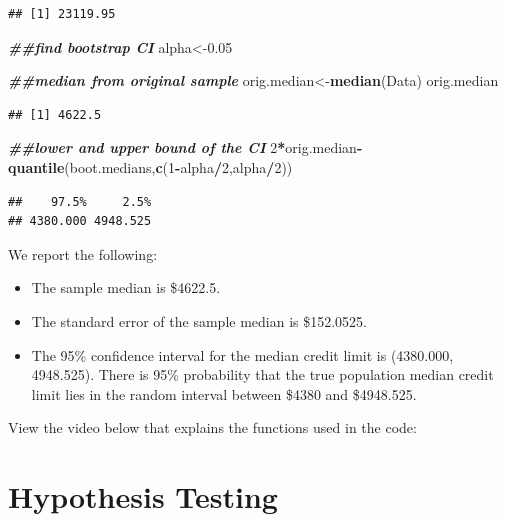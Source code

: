 \documentclass[
]{book}
\newenvironment{Shaded}{\begin{snugshade}}{\end{snugshade}}
\newcommand{\DecValTok}[1]{\textcolor[rgb]{0.00,0.00,0.81}{#1}}
\newcommand{\DocumentationTok}[1]{\textcolor[rgb]{0.56,0.35,0.01}{\textbf{\textit{#1}}}}
\newcommand{\FloatTok}[1]{\textcolor[rgb]{0.00,0.00,0.81}{#1}}
\newcommand{\FunctionTok}[1]{\textcolor[rgb]{0.13,0.29,0.53}{\textbf{#1}}}
\newcommand{\NormalTok}[1]{#1}
\newcommand{\OtherTok}[1]{\textcolor[rgb]{0.56,0.35,0.01}{#1}}
\newcommand{\SpecialCharTok}[1]{\textcolor[rgb]{0.81,0.36,0.00}{\textbf{#1}}}
\providecommand{\tightlist}{%
  \setlength{\itemsep}{0pt}\setlength{\parskip}{0pt}}
\begin{document}
\begin{verbatim}
## [1] 23119.95
\end{verbatim}

\begin{Shaded}
\begin{Highlighting}[]
\DocumentationTok{\#\#find bootstrap CI}
\NormalTok{alpha}\OtherTok{\textless{}{-}}\FloatTok{0.05}

\DocumentationTok{\#\#median from original sample}
\NormalTok{orig.median}\OtherTok{\textless{}{-}}\FunctionTok{median}\NormalTok{(Data)}
\NormalTok{orig.median}
\end{Highlighting}
\end{Shaded}

\begin{verbatim}
## [1] 4622.5
\end{verbatim}

\begin{Shaded}
\begin{Highlighting}[]
\DocumentationTok{\#\#lower and upper bound of the CI}
\DecValTok{2}\SpecialCharTok{*}\NormalTok{orig.median}\SpecialCharTok{{-}}\FunctionTok{quantile}\NormalTok{(boot.medians,}\FunctionTok{c}\NormalTok{(}\DecValTok{1}\SpecialCharTok{{-}}\NormalTok{alpha}\SpecialCharTok{/}\DecValTok{2}\NormalTok{,alpha}\SpecialCharTok{/}\DecValTok{2}\NormalTok{))}
\end{Highlighting}
\end{Shaded}

\begin{verbatim}
##    97.5%     2.5% 
## 4380.000 4948.525
\end{verbatim}

We report the following:

\begin{itemize}
\tightlist
\item
  The sample median is \$4622.5.
\item
  The standard error of the sample median is \$152.0525.
\item
  The 95\% confidence interval for the median credit limit is (4380.000, 4948.525). There is 95\% probability that the true population median credit limit lies in the random interval between \$4380 and \$4948.525.
\end{itemize}

View the video below that explains the functions used in the code:

\chapter{Hypothesis Testing}\label{hypothesis-testing}
\end{document}
